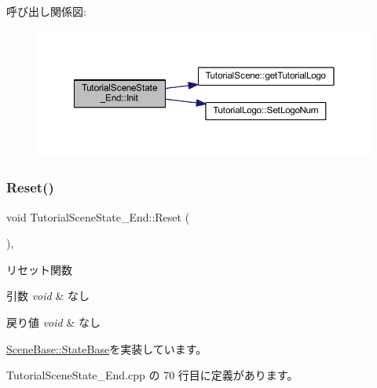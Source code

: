 呼び出し関係図\+:
\nopagebreak
\begin{figure}[H]
\begin{center}
\leavevmode
\includegraphics[width=350pt]{class_tutorial_scene_state___end_a572e5687140ff5ac43789f90462c05a5_cgraph}
\end{center}
\end{figure}
\mbox{\label{class_tutorial_scene_state___end_ada1a87235a021b40f8eca96e31879227}} 
\subsubsection{\texorpdfstring{Reset()}{Reset()}}
{\footnotesize\ttfamily void Tutorial\+Scene\+State\+\_\+\+End\+::\+Reset (\begin{DoxyParamCaption}{ }\end{DoxyParamCaption})\hspace{0.3cm}{\ttfamily [override]}, {\ttfamily [virtual]}}



リセット関数 


\begin{DoxyParams}{引数}
{\em void} & なし \\
\hline
\end{DoxyParams}

\begin{DoxyRetVals}{戻り値}
{\em void} & なし \\
\hline
\end{DoxyRetVals}


\mbox{\hyperlink{class_scene_base_1_1_state_base_a2e14a3afece0b1d8db9edcebf514a977}{Scene\+Base\+::\+State\+Base}}を実装しています。



 Tutorial\+Scene\+State\+\_\+\+End.\+cpp の 70 行目に定義があります。

